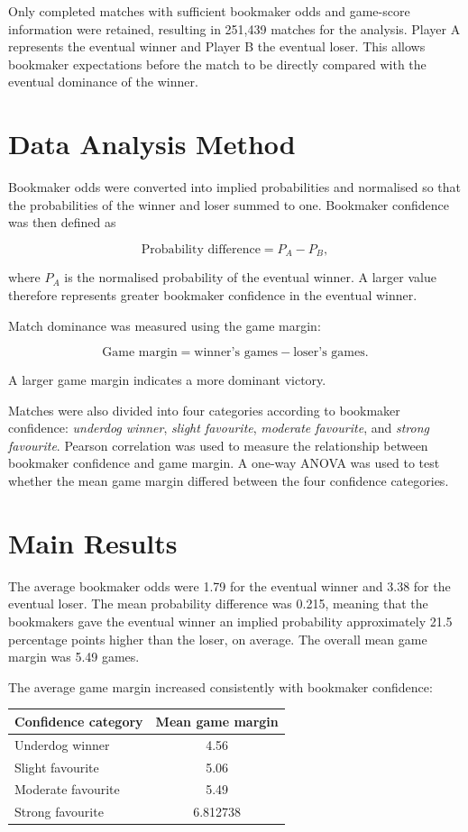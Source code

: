 \documentclass[10pt,a4paper]{article}
\begin{document}
Only completed matches with sufficient bookmaker odds and game-score information were retained, resulting in 251,439 matches for the analysis. Player A represents the eventual winner and Player B the eventual loser. This allows bookmaker expectations before the match to be directly compared with the eventual dominance of the winner.

\section{Data Analysis Method}

Bookmaker odds were converted into implied probabilities and normalised so that the probabilities of the winner and loser summed to one. Bookmaker confidence was then defined as

\[
\text{Probability difference}=P_A-P_B,
\]

where $P_A$ is the normalised probability of the eventual winner. A larger value therefore represents greater bookmaker confidence in the eventual winner.

Match dominance was measured using the game margin:

\[
\text{Game margin}=
\text{winner's games}-\text{loser's games}.
\]

A larger game margin indicates a more dominant victory.

Matches were also divided into four categories according to bookmaker confidence: \textit{underdog winner}, \textit{slight favourite}, \textit{moderate favourite}, and \textit{strong favourite}. Pearson correlation was used to measure the relationship between bookmaker confidence and game margin. A one-way ANOVA was used to test whether the mean game margin differed between the four confidence categories.

\section{Main Results}

The average bookmaker odds were 1.79 for the eventual winner and 3.38 for the eventual loser. The mean probability difference was 0.215, meaning that the bookmakers gave the eventual winner an implied probability approximately 21.5 percentage points higher than the loser, on average. The overall mean game margin was 5.49 games.

The average game margin increased consistently with bookmaker confidence:

\begin{center}
\begin{tabular}{lc}
\toprule
\textbf{Confidence category} & \textbf{Mean game margin} \\
\midrule
Underdog winner & 4.56 \\
Slight favourite & 5.06 \\
Moderate favourite & 5.49 \\
Strong favourite & 6.812738 \\
\bottomrule
\end{tabular}
\end{center}
\end{document}
